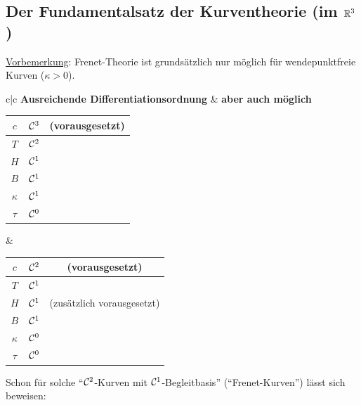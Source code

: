 \subsection{Der Fundamentalsatz der Kurventheorie (im $\mathbb{R}^3$)}
\uline{Vorbemerkung}: Frenet-Theorie ist grundsätzlich nur möglich für wendepunktfreie Kurven (\(\kappa > 0\)). \\
\begin{center}
\begin{tabular}{c|c}
 \textbf{Ausreichende Differentiationsordnung} & \textbf{aber auch möglich} \\
 \begin{tabular}{c c c}
 \(c\) & \(\mathcal{C}^3\) &(vorausgesetzt) \\
 \hline
 \(T\) & \(\mathcal{C}^2\) &\\
 \(H\) & \(\mathcal{C}^1\) &\\
 \(B\) & \(\mathcal{C}^1\) &\\
 \hline
 \(\kappa\) & \(\mathcal{C}^1\) &\\
 \(\tau\) & \(\mathcal{C}^0\) &
 \end{tabular}
 &
 \begin{tabular}{c c c}
 \(c\) & \(\mathcal{C}^2\) &(vorausgesetzt)\\
 \hline
 \(T\) & \(\mathcal{C}^1\) &\\
 \(H\) & \(\mathcal{C}^1\) &(zusätzlich vorausgesetzt) \\
 \(B\) & \(\mathcal{C}^1\) &\\
 \hline
 \(\kappa\) & \(\mathcal{C}^0\) &\\
 \(\tau\) & \(\mathcal{C}^0\) &
 \end{tabular}
\end{tabular}
\end{center} 
Schon für solche "`\(\mathcal{C}^2\)-Kurven mit \(\mathcal{C}^1\)-Begleitbasis"' ("`Frenet-Kurven"') lässt sich beweisen:

